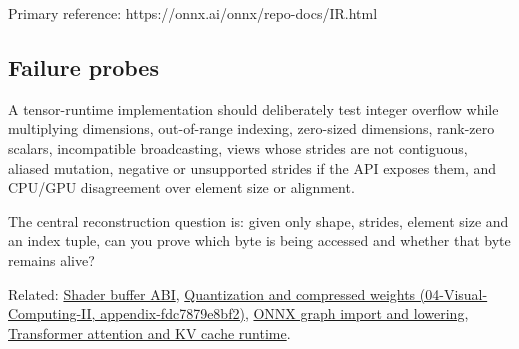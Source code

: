 Primary reference: https://onnx.ai/onnx/repo-docs/IR.html

\subsection{Failure probes}\label{appendix-cebadf3106d1-failure-probes}

A tensor-runtime implementation should deliberately test integer overflow while multiplying dimensions, out-of-range indexing, zero-sized dimensions, rank-zero scalars, incompatible broadcasting, views whose strides are not contiguous, aliased mutation, negative or unsupported strides if the API exposes them, and CPU/GPU disagreement over element size or alignment.

The central reconstruction question is: given only shape, strides, element size and an index tuple, can you prove which byte is being accessed and whether that byte remains alive?

Related: \hyperref[appendix-749048795dbb]{Shader buffer ABI}, \href{../04-Visual-Computing-II/main.pdf\#nameddest=appendix-fdc7879e8bf2}{Quantization and compressed weights (04-Visual-Computing-II, appendix-fdc7879e8bf2)}, \hyperref[appendix-a87217e3af2b]{ONNX graph import and lowering}, \hyperref[appendix-ea2dadd21ce5]{Transformer attention and KV cache runtime}.
